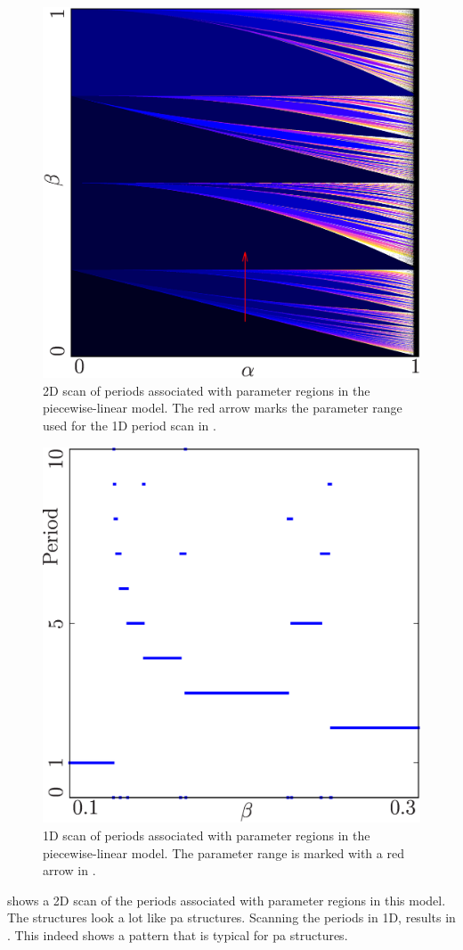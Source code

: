 \begin{figure}
	\centering
	\includegraphics[width=0.7 \textwidth]{../Figures/A/A.1/result.png}
	\caption[2D scan of periods associated with parameter regions in the piecewise-linear model]{
		2D scan of periods associated with parameter regions in the piecewise-linear model.
		The red arrow marks the parameter range used for the 1D period scan in .
	}
	\label{fig:app.model.lin.2D}
\end{figure}

\begin{figure}
	\centering
	\includegraphics[width=0.6 \textwidth]{../Figures/A/A.2/result.png}
	\caption[1D scan of periods associated with parameter regions in the piecewise-linear model]{
		1D scan of periods associated with parameter regions in the piecewise-linear model.
		The parameter range is marked with a red arrow in .
	}
	\label{fig:app.model.lin.1D}
\end{figure}

 shows a 2D scan of the periods associated with parameter regions in this model.
The structures look a lot like \gls{pa} structures.
Scanning the periods in 1D, results in .
This indeed shows a pattern that is typical for \gls{pa} structures.
